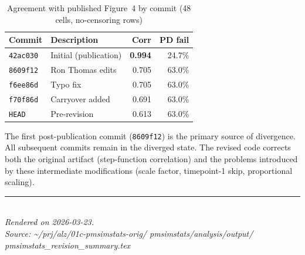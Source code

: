 \documentclass[11pt]{article}
\begin{document}
\begin{table}[h]
\centering
\caption{Agreement with published Figure~4 by commit
  (48 cells, no-censoring rows)}
\begin{tabular}{llrr}
\toprule
Commit & Description & Corr & PD fail \\
\midrule
\texttt{42ac030} & Initial (publication) &
  \textbf{0.994} & 24.7\% \\
\texttt{8609f12} & Ron Thomas edits &
  0.705 & 63.0\% \\
\texttt{f6ee86d} & Typo fix &
  0.705 & 63.0\% \\
\texttt{f70f86d} & Carryover added &
  0.691 & 63.0\% \\
\texttt{HEAD} & Pre-revision &
  0.613 & 63.0\% \\
\bottomrule
\end{tabular}
\end{table}

The first post-publication commit (\texttt{8609f12}) is the
primary source of divergence. All subsequent commits remain
in the diverged state. The revised code corrects both the
original artifact (step-function correlation) and the
problems introduced by these intermediate modifications
(scale factor, timepoint-1 skip, proportional scaling).

\vfill
\noindent\rule{\textwidth}{0.4pt}\\
{\small\textit{Rendered on 2026-03-23.}\\
\textit{Source: \textasciitilde/prj/alz/01c-pmsimstats-orig/%
pmsimstats/analysis/output/%
pmsimstats\_revision\_summary.tex}}
\end{document}
